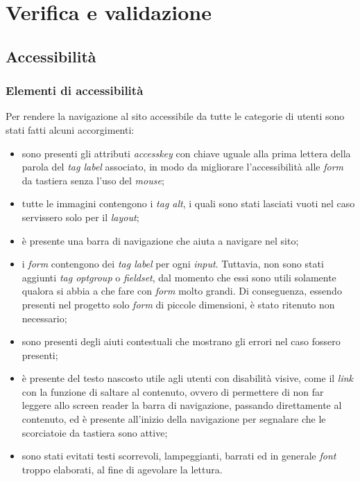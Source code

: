 
\chapter{Verifica e validazione}
\label{cap:verifica-validazione}

\section{Accessibilità}
\subsection{Elementi di accessibilità}
Per rendere la navigazione al sito accessibile da tutte le categorie di utenti
sono stati fatti alcuni accorgimenti:
\begin{itemize}
      \item sono presenti gli attributi \textit{accesskey} con chiave uguale
            alla
            prima lettera della parola del \textit{tag label} associato, in
            modo
            da
            migliorare l'accessibilità alle \textit{form} da tastiera senza
            l'uso
            del
            \textit{mouse};
      \item tutte le immagini contengono i \textit{tag alt}, i quali sono stati
            lasciati vuoti nel caso servissero solo per il \textit{layout};
      \item è presente una barra di navigazione che aiuta a navigare nel sito;
      \item i \textit{form} contengono dei \textit{tag label} per ogni
            \textit{input}. Tuttavia, non sono stati aggiunti \textit{tag
                  optgroup} o
            \textit{fieldset}, dal momento che essi sono utili solamente
            qualora si abbia a che fare con \textit{form}
            molto grandi.
            Di conseguenza, essendo presenti nel progetto solo  \textit{form} di piccole
            dimensioni, è stato ritenuto non necessario;
      \item sono presenti degli aiuti contestuali che mostrano gli errori nel
            caso fossero presenti;
      \item è presente del testo nascosto utile agli utenti con disabilità
            visive, come il \textit{link} con la funzione  di saltare al
            contenuto, ovvero
            di permettere di non far leggere allo \gls{screen reader} la barra
            di
            navigazione, passando direttamente al contenuto, ed è presente
            all'inizio della
            navigazione per segnalare che le scorciatoie da tastiera sono
            attive;
      \item sono stati evitati testi scorrevoli, lampeggianti, barrati ed in
            generale \textit{font} troppo elaborati, al fine di agevolare la
            lettura.
\end{itemize}

